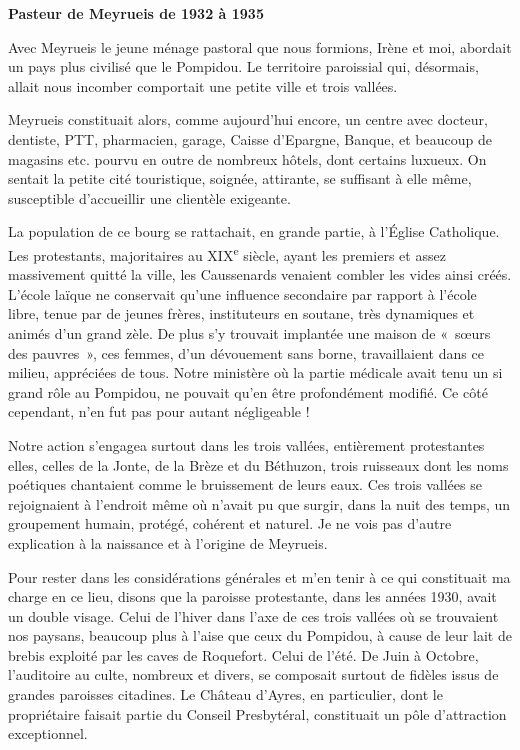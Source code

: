 

\begin{center}
\vspace{0.4em}
\textbf{Pasteur de Meyrueis de 1932 à 1935}
\end{center}

Avec Meyrueis le jeune ménage pastoral que nous formions, Irène et moi, abordait un
pays plus civilisé que le Pompidou. Le territoire paroissial qui, désormais, allait nous
incomber comportait une petite ville et trois vallées.

Meyrueis constituait alors, comme aujourd’hui encore, un centre avec docteur,
dentiste, PTT, pharmacien, garage, Caisse d’Epargne, Banque, et beaucoup de
magasins etc. pourvu en outre de nombreux hôtels, dont certains luxueux. On sentait
la petite cité touristique, soignée, attirante, se suffisant à elle même, susceptible
d’accueillir une clientèle exigeante.

La population de ce bourg se rattachait, en grande partie, à l’Église Catholique. Les
protestants, majoritaires au XIX\textsuperscript{e} siècle, ayant les premiers et assez massivement quitté
la ville, les Caussenards venaient combler les vides ainsi créés. L’école laïque ne
conservait qu’une influence secondaire par rapport à l’école libre, tenue par de jeunes
frères, instituteurs en soutane, très dynamiques et animés d’un grand zèle. De plus s’y
trouvait implantée une maison de «~sœurs des pauvres~», ces femmes, d’un
dévouement sans borne, travaillaient dans ce milieu, appréciées de tous.
Notre ministère où la partie médicale avait tenu un si grand rôle au Pompidou, ne
pouvait qu’en être profondément modifié. Ce côté cependant, n’en fut pas pour
autant négligeable !

Notre action s’engagea surtout dans les trois vallées, entièrement protestantes elles,
celles de la Jonte, de la Brèze et du Béthuzon, trois ruisseaux dont les noms poétiques
chantaient comme le bruissement de leurs eaux. Ces trois vallées se rejoignaient à
l’endroit même où n’avait pu que surgir, dans la nuit des temps, un groupement
humain, protégé, cohérent et naturel.
Je ne vois pas d’autre explication à la naissance et à l’origine de Meyrueis.

Pour rester dans les considérations générales et m’en tenir à ce qui constituait ma
charge en ce lieu, disons que la paroisse protestante, dans les années 1930, avait un
double visage. Celui de l’hiver dans l’axe de ces trois vallées où se trouvaient nos
paysans, beaucoup plus à l’aise que ceux du Pompidou, à cause de leur lait de brebis
exploité par les caves de Roquefort. Celui de l’été. De Juin à Octobre, l’auditoire au
culte, nombreux et divers, se composait surtout de fidèles issus de grandes paroisses
citadines. Le Château d’Ayres, en particulier, dont le propriétaire faisait partie du
Conseil Presbytéral, constituait un pôle d’attraction exceptionnel.

